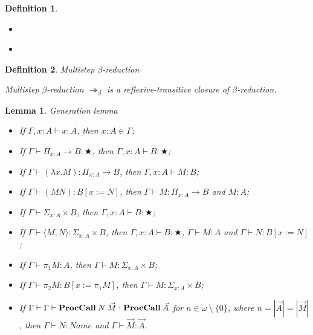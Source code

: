 \documentclass[a4paper]{article}
\newtheorem{defin}{Definition}
\newtheorem{lemma}{Lemma}
\begin{document}
\begin{defin}
\begin{itemize}
\begin{prooftree}
  \end{prooftree}
  \item
  \begin{prooftree}
  \end{prooftree}
  \item
  \begin{prooftree}
  \end{prooftree}
\end{itemize}
\end{defin}

\begin{defin} Multistep $\beta$-reduction

  Multistep $\beta$-reduction $\twoheadrightarrow_{\beta}$ is a reflexive-transitive closure of $\beta$-reduction.
\end{defin}

\begin{lemma} Generation lemma

  \begin{itemize}
    \item If $\Gamma, x : A \vdash x : A$, then $x : A \in \Gamma$;
    \item If $\Gamma \vdash \Pi_{x : A} \to B : \bigstar$, then $\Gamma, x : A \vdash B : \bigstar$;
    \item If $\Gamma \vdash (\lambda x. M) : \Pi_{x : A} \to B$, then $\Gamma, x : A \vdash M : B$;
    \item If $\Gamma \vdash (M N) : B [x := N]$, then $\Gamma \vdash M :  \Pi_{x : A} \to B$ and $M : A$;
    \item If $\Gamma \vdash \Sigma_{x : A} \times B$, then $\Gamma, x : A \vdash B : \bigstar$;
    \item If $\Gamma \vdash \langle M , N \rangle : \Sigma_{x : A} \times B$, then $\Gamma, x : A \vdash B : \bigstar$, $\Gamma \vdash M : A$ and $\Gamma \vdash N : B [x := N]$;
    \item If $\Gamma \vdash \pi_1 M : A $, then $\Gamma \vdash M : \Sigma_{x : A} \times B$;
    \item If $\Gamma \vdash \pi_2 M : B [x := \pi_1 M]$, then $\Gamma \vdash M : \Sigma_{x : A} \times B$;
    \item If $\Gamma \vdash \Gamma \vdash {\bf ProcCall} \: N \: \vec{M} : {\bf ProcCall} \: \vec{A}$ for $n \in \omega \: \setminus \: \{ 0 \}$, where $n = |\vec{A}| = |\vec{M}|$,
    then $\Gamma \vdash N : Name$ and $\Gamma \vdash \vec{M} : \vec{A}$.
  \end{itemize}
\end{lemma}
\end{document}
